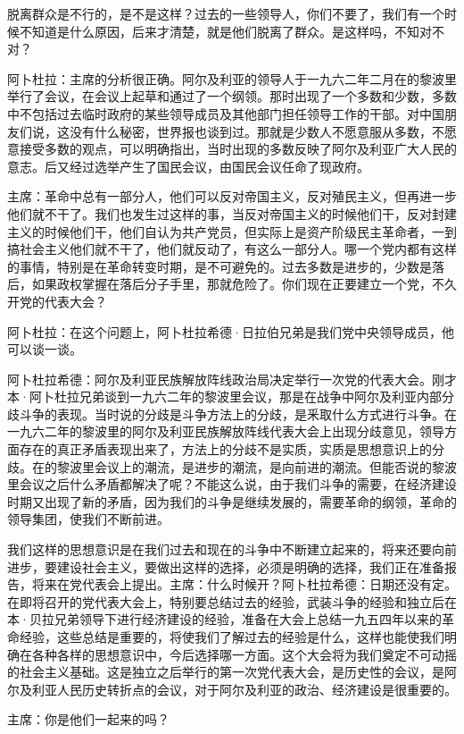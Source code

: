 脱离群众是不行的，是不是这样？过去的一些领导人，你们不要了，我们有一个时候不知道是什么原因，后来才清楚，就是他们脱离了群众。是这样吗，不知对不对？

阿卜杜拉：主席的分析很正确。阿尔及利亚的领导人于一九六二年二月在的黎波里举行了会议，在会议上起草和通过了一个纲领。那时出现了一个多数和少数，多数中不包括过去临时政府的某些领导成员及其他部门担任领导工作的干部。对中国朋友们说，这没有什么秘密，世界报也谈到过。那就是少数人不愿意服从多数，不愿意接受多数的观点，可以明确指出，当时出现的多数反映了阿尔及利亚广大人民的意志。后又经过选举产生了国民会议，由国民会议任命了现政府。

主席：革命中总有一部分人，他们可以反对帝国主义，反对殖民主义，但再进一步他们就不干了。我们也发生过这样的事，当反对帝国主义的时候他们干，反对封建主义的时候他们干，他们自认为共产党员，但实际上是资产阶级民主革命者，一到搞社会主义他们就不干了，他们就反动了，有这么一部分人。哪一个党内都有这样的事情，特别是在革命转变时期，是不可避免的。过去多数是进步的，少数是落后，如果政权掌握在落后分子手里，那就危险了。你们现在正要建立一个党，不久开党的代表大会？

阿卜杜拉：在这个问题上，阿卜杜拉希德·日拉伯兄弟是我们党中央领导成员，他可以谈一谈。

阿卜杜拉希德：阿尔及利亚民族解放阵线政治局决定举行一次党的代表大会。刚才本·阿卜杜拉兄弟谈到一九六二年的黎波里会议，那是在战争中阿尔及利亚内部分歧斗争的表现。当时说的分歧是斗争方法上的分歧，是釆取什么方式进行斗争。在一九六二年的黎波里的阿尔及利亚民族解放阵线代表大会上出现分歧意见，领导方面存在的真正矛盾表现出来了，方法上的分歧不是实质，实质是思想意识上的分歧。在的黎波里会议上的潮流，是进步的潮流，是向前进的潮流。但能否说的黎波里会议之后什么矛盾都解决了呢？不能这么说，由于我们斗争的需要，在经济建设时期又出现了新的矛盾，因为我们的斗争是继续发展的，需要革命的纲领，革命的领导集团，使我们不断前进。

我们这样的思想意识是在我们过去和现在的斗争中不断建立起来的，将来还要向前进步，要建设社会主义，要做出这样的选择，必须是明确的选择，我们正在准备报告，将来在党代表会上提出。主席：什么时候开？阿卜杜拉希德：日期还没有定。在即将召开的党代表大会上，特别要总结过去的经验，武装斗争的经验和独立后在本·贝拉兄弟领导下进行经济建设的经验，准备在大会上总结一九五四年以来的革命经验，这些总结是重要的，将使我们了解过去的经验是什么，这样也能使我们明确在各种各样的思想意识中，今后选择哪一方面。这个大会将为我们奠定不可动摇的社会主义基础。这是独立之后举行的第一次党代表大会，是历史性的会议，是阿尔及利亚人民历史转折点的会议，对于阿尔及利亚的政治、经济建设是很重要的。

主席：你是他们一起来的吗？


